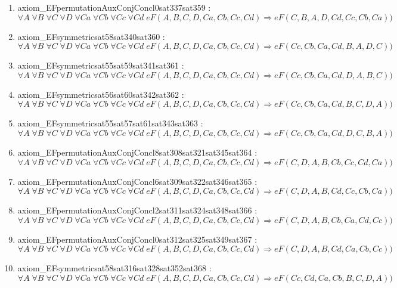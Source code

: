 \documentclass{article}
\begin{document}
\begin{enumerate}
\item axiom\_EFpermutationAuxConjConcl0sat337sat359 : $\forall A\;\forall B\;\forall C\;\forall D\;\forall Ca\;\forall Cb\;\forall Cc\;\forall Cd\;eF(A, B, C, D, Ca, Cb, Cc, Cd) \Rightarrow eF(C, B, A, D, Cd, Cc, Cb, Ca))$
\item axiom\_EFsymmetricsat58sat340sat360 : $\forall A\;\forall B\;\forall C\;\forall D\;\forall Ca\;\forall Cb\;\forall Cc\;\forall Cd\;eF(A, B, C, D, Ca, Cb, Cc, Cd) \Rightarrow eF(Cc, Cb, Ca, Cd, B, A, D, C))$
\item axiom\_EFsymmetricsat55sat59sat341sat361 : $\forall A\;\forall B\;\forall C\;\forall D\;\forall Ca\;\forall Cb\;\forall Cc\;\forall Cd\;eF(A, B, C, D, Ca, Cb, Cc, Cd) \Rightarrow eF(Cc, Cb, Ca, Cd, D, A, B, C))$
\item axiom\_EFsymmetricsat56sat60sat342sat362 : $\forall A\;\forall B\;\forall C\;\forall D\;\forall Ca\;\forall Cb\;\forall Cc\;\forall Cd\;eF(A, B, C, D, Ca, Cb, Cc, Cd) \Rightarrow eF(Cc, Cb, Ca, Cd, B, C, D, A))$
\item axiom\_EFsymmetricsat55sat57sat61sat343sat363 : $\forall A\;\forall B\;\forall C\;\forall D\;\forall Ca\;\forall Cb\;\forall Cc\;\forall Cd\;eF(A, B, C, D, Ca, Cb, Cc, Cd) \Rightarrow eF(Cc, Cb, Ca, Cd, D, C, B, A))$
\item axiom\_EFpermutationAuxConjConcl8sat308sat321sat345sat364 : $\forall A\;\forall B\;\forall C\;\forall D\;\forall Ca\;\forall Cb\;\forall Cc\;\forall Cd\;eF(A, B, C, D, Ca, Cb, Cc, Cd) \Rightarrow eF(C, D, A, B, Cb, Cc, Cd, Ca))$
\item axiom\_EFpermutationAuxConjConcl6sat309sat322sat346sat365 : $\forall A\;\forall B\;\forall C\;\forall D\;\forall Ca\;\forall Cb\;\forall Cc\;\forall Cd\;eF(A, B, C, D, Ca, Cb, Cc, Cd) \Rightarrow eF(C, D, A, B, Cd, Cc, Cb, Ca))$
\item axiom\_EFpermutationAuxConjConcl2sat311sat324sat348sat366 : $\forall A\;\forall B\;\forall C\;\forall D\;\forall Ca\;\forall Cb\;\forall Cc\;\forall Cd\;eF(A, B, C, D, Ca, Cb, Cc, Cd) \Rightarrow eF(C, D, A, B, Cb, Ca, Cd, Cc))$
\item axiom\_EFpermutationAuxConjConcl0sat312sat325sat349sat367 : $\forall A\;\forall B\;\forall C\;\forall D\;\forall Ca\;\forall Cb\;\forall Cc\;\forall Cd\;eF(A, B, C, D, Ca, Cb, Cc, Cd) \Rightarrow eF(C, D, A, B, Cd, Ca, Cb, Cc))$
\item axiom\_EFsymmetricsat58sat316sat328sat352sat368 : $\forall A\;\forall B\;\forall C\;\forall D\;\forall Ca\;\forall Cb\;\forall Cc\;\forall Cd\;eF(A, B, C, D, Ca, Cb, Cc, Cd) \Rightarrow eF(Cc, Cd, Ca, Cb, B, C, D, A))$

\end{enumerate}
\end{document}
